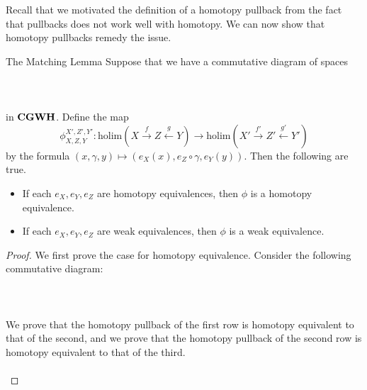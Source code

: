 \documentclass[a4paper]{article}
\begin{document}
Recall that we motivated the definition of a homotopy pullback from the fact that pullbacks does not work well with homotopy. We can now show that homotopy pullbacks remedy the issue. 

\begin{thm}{The Matching Lemma}{} Suppose that we have a commutative diagram of spaces \\~\\
\\~\\
in $\bold{CGWH}$. Define the map $$\phi_{X,Z,Y}^{X',Z',Y'}:\text{holim}(X\overset{f}{\rightarrow}Z\overset{g}{\leftarrow}Y)\to\text{holim}(X'\overset{f'}{\rightarrow}Z'\overset{g'}{\leftarrow}Y')$$ by the formula $(x,\gamma,y)\mapsto(e_X(x),e_Z\circ\gamma,e_Y(y))$. Then the following are true. 
\begin{itemize}
\item If each $e_X,e_Y,e_Z$ are homotopy equivalences, then $\phi$ is a homotopy equivalence. 
\item If each $e_X,e_Y,e_Z$ are weak equivalences, then $\phi$ is a weak equivalence. 
\end{itemize} \tcbline
\begin{proof}
We first prove the case for homotopy equivalence. Consider the following commutative diagram: \\~\\
\\~\\
We prove that the homotopy pullback of the first row is homotopy equivalent to that of the second, and we prove that the homotopy pullback of the second row is homotopy equivalent to that of the third. \\~\\


\end{proof}
\end{thm}
\end{document}
